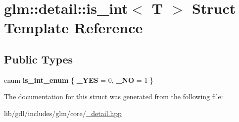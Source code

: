 \hypertarget{structglm_1_1detail_1_1is__int}{}\section{glm\+:\+:detail\+:\+:is\+\_\+int$<$ T $>$ Struct Template Reference}
\label{structglm_1_1detail_1_1is__int}
\subsection*{Public Types}
\begin{DoxyCompactItemize}
\item 
\hypertarget{structglm_1_1detail_1_1is__int_a83b33e85edd3342274d480f8dfc8c37f}{}enum {\bfseries is\+\_\+int\+\_\+enum} \{ {\bfseries \+\_\+\+Y\+E\+S} = 0, 
{\bfseries \+\_\+\+N\+O} = 1
 \}\label{structglm_1_1detail_1_1is__int_a83b33e85edd3342274d480f8dfc8c37f}

\end{DoxyCompactItemize}


The documentation for this struct was generated from the following file\+:\begin{DoxyCompactItemize}
\item 
lib/gdl/includes/glm/core/\hyperlink{__detail_8hpp}{\+\_\+detail.\+hpp}\end{DoxyCompactItemize}
